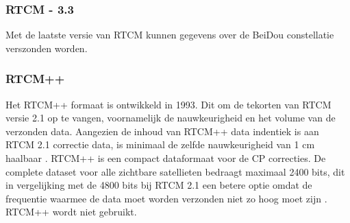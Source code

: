 \subsubsection{RTCM - 3.3}
Met de laatste versie van RTCM kunnen gegevens over de BeiDou constellatie verszonden worden. 

\subsubsection{RTCM++}
Het RTCM++ formaat is ontwikkeld in 1993. Dit om de tekorten van RTCM versie 2.1 op te vangen, voornamelijk de nauwkeurigheid en het volume van de verzonden data. Aangezien de inhoud van RTCM++ data indentiek is aan RTCM 2.1 correctie data, is minimaal de zelfde nauwkeurigheid van 1 cm haalbaar \cite{LBibRTCM3}. RTCM++ is een compact dataformaat voor de CP correcties. De complete dataset voor alle zichtbare satellieten bedraagt maximaal 2400 bits, dit in vergelijking met de 4800 bits bij RTCM 2.1 een betere optie omdat de frequentie waarmee de data moet worden verzonden niet zo hoog moet zijn \cite{LBibRTCM4}. RTCM++ wordt niet gebruikt. 

